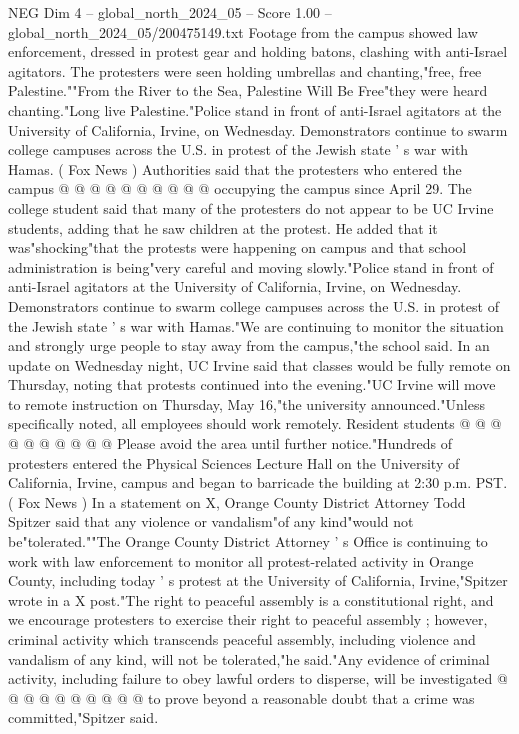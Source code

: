 \begin{textsample}{NEG Dim 4 – global\_north\_2024\_05 – Score 1.00 – global\_north\_2024\_05/200475149.txt}
Footage from the campus showed law enforcement, dressed in protest gear and holding batons, clashing with anti-Israel agitators.
The protesters were seen holding umbrellas and chanting,"free, free Palestine.""From the River to the Sea, Palestine Will Be Free"they were heard chanting."Long live Palestine."Police stand in front of anti-Israel agitators at the University of California, Irvine, on Wednesday.
Demonstrators continue to swarm college campuses across the U.S. in protest of the Jewish state ' s war with Hamas. ( Fox News ) Authorities said that the protesters who entered the campus @ @ @ @ @ @ @ @ @ @ occupying the campus since April 29.
The college student said that many of the protesters do not appear to be UC Irvine students, adding that he saw children at the protest.
He added that it was"shocking"that the protests were happening on campus and that school administration is being"very careful and moving slowly."Police stand in front of anti-Israel agitators at the University of California, Irvine, on Wednesday.
Demonstrators continue to swarm college campuses across the U.S. in protest of the Jewish state ' s war with Hamas."We are continuing to monitor the situation and strongly urge people to stay away from the campus,"the school said.
In an update on Wednesday night, UC Irvine said that classes would be fully remote on Thursday, noting that protests continued into the evening."UC Irvine will move to remote instruction on Thursday, May 16,"the university announced."Unless specifically noted, all employees should work remotely.
Resident students @ @ @ @ @ @ @ @ @ @ Please avoid the area until further notice."Hundreds of protesters entered the Physical Sciences Lecture Hall on the University of California, Irvine, campus and began to barricade the building at 2:30 p.m.
PST. ( Fox News ) In a statement on X, Orange County District Attorney Todd Spitzer said that any violence or vandalism"of any kind"would not be"tolerated.""The Orange County District Attorney ' s Office is continuing to work with law enforcement to monitor all protest-related activity in Orange County, including today ' s protest at the University of California, Irvine,"Spitzer wrote in a X post."The right to peaceful assembly is a constitutional right, and we encourage protesters to exercise their right to peaceful assembly ; however, criminal activity which transcends peaceful assembly, including violence and vandalism of any kind, will not be tolerated,"he said."Any evidence of criminal activity, including failure to obey lawful orders to disperse, will be investigated @ @ @ @ @ @ @ @ @ @ to prove beyond a reasonable doubt that a crime was committed,"Spitzer said.

\end{textsample}
